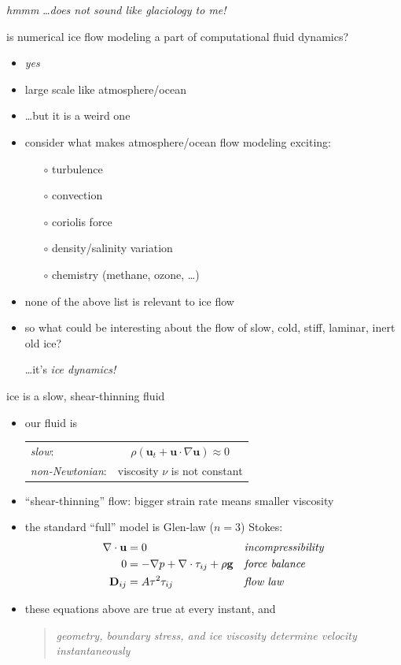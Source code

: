 \documentclass[titlepage,letterpaper,final,11pt]{scrartcl}
\newcommand{\alert}[1]{\emph{#1}}
\begin{document}
\emph{hmmm} \dots \emph{does not sound like glaciology to me!}

is numerical ice flow modeling a part of computational fluid dynamics?

\begin{itemize}
\item \alert{yes}
\item large scale like atmosphere/ocean
\item \dots but it is a weird one
\item consider what makes atmosphere/ocean flow modeling exciting:
  \begin{itemize}
  \item[$\circ$] turbulence
  \item[$\circ$] convection
  \item[$\circ$] coriolis force
  \item[$\circ$] density/salinity variation
  \item[$\circ$] chemistry (methane, ozone, \dots)
  \end{itemize}
\item none of the above list is relevant to ice flow
\item so what could be interesting about the flow of slow, cold, stiff, laminar, inert old ice?

 \qquad \dots \qquad it's \emph{ice dynamics!}
\end{itemize}


ice is a slow, shear-thinning fluid

\begin{itemize}
\item our fluid is

  \begin{tabular}{lc}
  \emph{slow}: & $\rho \left(\mathbf{u}_t + \mathbf{u}\cdot\nabla \mathbf{u}\right) \approx 0$ \\
  \emph{non-Newtonian}: & viscosity $\nu$ is not constant
  \end{tabular}
\item ``shear-thinning'' flow: bigger strain rate means smaller viscosity
\item the standard ``full'' model is Glen-law ($n=3$) Stokes:
\begin{align*}
\nabla \cdot \mathbf{u} &= 0 &&\text{\emph{incompressibility}} \\
0 &= - \nabla p + \nabla \cdot \tau_{ij} + \rho \mathbf{g} &&\text{\emph{force balance}} \\
\mathbf{D}_{ij} &= A \tau^2 \tau_{ij} &&\text{\emph{flow law}}
\end{align*}
\item these equations above are true at every instant, and
  \begin{quote}
  \emph{geometry, boundary stress, and ice viscosity determine velocity instantaneously}
  \end{quote}
\end{itemize}
\end{document}
